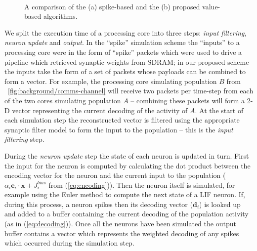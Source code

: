 \documentclass[conference]{IEEEtran}
\renewcommand{\vec}{\mathbf}  %
\begin{document}
  \begin{figure}
    \\
      \caption{A comparison of the (a) spike-based and the (b) proposed value-based algorithms.}
  \end{figure}


  We split the execution time of a processing core into three steps: \textit{input filtering}, \textit{neuron update} and \textit{output}.
  In the ``spike'' simulation scheme the ``inputs'' to a processing core were in the form of ``spike'' packets which were used to drive a pipeline which retrieved synaptic weights from SDRAM; in our proposed scheme the inputs take the form of a set of packets whose payloads can be combined to form a vector.
  For example, the processing core simulating population $B$ from \figurename~\ref{fig:background/comms-channel} will receive two packets per time-step from each of the two cores simulating population $A$ -- combining these packets will form a 2-D vector representing the current decoding of the activity of $A$.
  At the start of each simulation step the reconstructed vector is filtered using the appropriate synaptic filter model to form the input to the population -- this is the \textit{input filtering} step.

  During the \textit{neuron update} step the state of each neuron is updated in turn.
  First the input for the neuron is computed by calculating the dot product between the encoding vector for the neuron and the current input to the population ($\alpha_i \vec{e}_i \cdot \vec{x} + J^{bias}_i$ from (\ref{eq:encoding})).
  Then the neuron itself is simulated, for example using the Euler method to compute the next state of a LIF neuron.
  If, during this process, a neuron spikes then its decoding vector ($\vec{d}_i$) is looked up and added to a buffer containing the current decoding of the population activity (as in (\ref{eq:decoding})).
  Once all the neurons have been simulated the output buffer contains a vector which represents the weighted decoding of any spikes which occurred during the simulation step.
\end{document}
